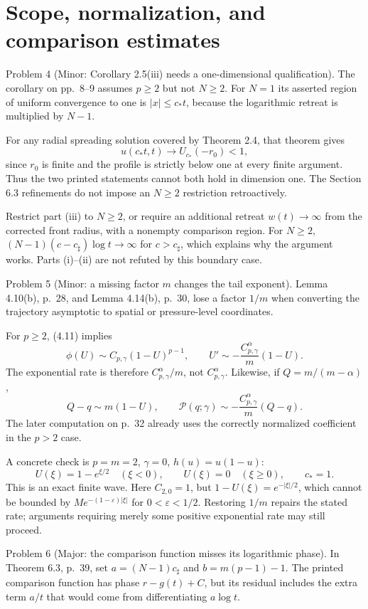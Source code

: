 \documentclass[10pt]{article}
\begin{document}
\section*{Scope, normalization, and comparison estimates}
Problem 4 (Minor: Corollary 2.5(iii) needs a one-dimensional qualification).  The corollary on pp. 8–9 assumes \(p\geq2\) but not \(N\geq2\). For \(N=1\) its asserted region of uniform convergence to one is \(|x|\leq c_*t\), because the logarithmic retreat is multiplied by \(N-1\).\par
For any radial spreading solution covered by Theorem 2.4, that theorem gives \[u(c_*t,t)\longrightarrow U_{c_*}(-r_0)<1,\] since \(r_0\) is finite and the profile is strictly below one at every finite argument. Thus the two printed statements cannot both hold in dimension one. The Section 6.3 refinements do not impose an \(N\geq2\) restriction retroactively.\par
Restrict part (iii) to \(N\geq2\), or require an additional retreat \(w(t)\to\infty\) from the corrected front radius, with a nonempty comparison region. For \(N\geq2\), \((N-1)(c-c_\sharp)\log t\to\infty\) for \(c>c_\sharp\), which explains why the argument works. Parts (i)–(ii) are not refuted by this boundary case.\par
Problem 5 (Minor: a missing factor \(m\) changes the tail exponent).  Lemma 4.10(b), p. 28, and Lemma 4.14(b), p. 30, lose a factor \(1/m\) when converting the trajectory asymptotic to spatial or pressure-level coordinates.\par
For \(p\geq2\), (4.11) implies \[\phi(U)\sim C_{p,\gamma}(1-U)^{p-1},\qquad
 U'\sim-\frac{C_{p,\gamma}^{\alpha}}m(1-U).\] The exponential rate is therefore \(C_{p,\gamma}^{\alpha}/m\), not \(C_{p,\gamma}^{\alpha}\). Likewise, if \(Q=m/(m-\alpha)\), \[Q-q\sim m(1-U),\qquad
 \mathcal P(q;\gamma)\sim
 -\frac{C_{p,\gamma}^{\alpha}}m(Q-q).\] The later computation on p. 32 already uses the correctly normalized coefficient in the \(p>2\) case.\par
A concrete check is \(p=m=2\), \(\gamma=0\), \(h(u)=u(1-u)\): \[U(\xi)=1-e^{\xi/2}\quad(\xi<0),\qquad
 U(\xi)=0\quad(\xi\geq0),\qquad c_*=1.\] This is an exact finite wave. Here \(C_{2,0}=1\), but \(1-U(\xi)=e^{-|\xi|/2}\), which cannot be bounded by \(M e^{-(1-\varepsilon)|\xi|}\) for \(0<\varepsilon<1/2\). Restoring \(1/m\) repairs the stated rate; arguments requiring merely some positive exponential rate may still proceed.\par
Problem 6 (Major: the comparison function misses its logarithmic phase).  In Theorem 6.3, p. 39, set \(a=(N-1)c_\sharp\) and \(b=m(p-1)-1\). The printed comparison function has phase \(r-g(t)+C\), but its residual includes the extra term \(a/t\) that would come from differentiating \(a\log t\).\par
\end{document}
